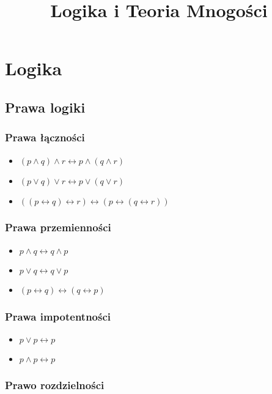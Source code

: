 \documentclass{../notatki}
\title{Logika i Teoria Mnogości}
\begin{document}
\tableofcontents

\section{Logika}

\subsection{Prawa logiki}

\subsubsection{Prawa łączności}

\begin{itemize}
  \item $(p \land q) \land r \leftrightarrow p \land (q \land r)$
  \item $(p \lor q) \lor r \leftrightarrow p \lor (q \lor r)$
  \item $((p \leftrightarrow q) \leftrightarrow r) \leftrightarrow (p
    \leftrightarrow (q \leftrightarrow r))$
\end{itemize}

\subsubsection{Prawa przemienności}

\begin{itemize}
  \item $p \land q \leftrightarrow q \land p$
  \item $p \lor q \leftrightarrow q \lor p$
  \item $(p \leftrightarrow q) \leftrightarrow (q \leftrightarrow p)$
\end{itemize}

\subsubsection{Prawa impotentności}

\begin{itemize}
  \item $p \lor p \leftrightarrow p$
  \item $p \land p \leftrightarrow p$
\end{itemize}

\subsubsection{Prawo rozdzielności}
\end{document}
